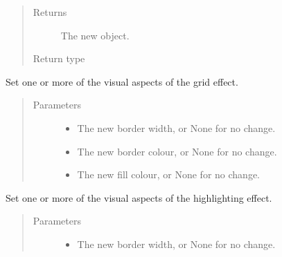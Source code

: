 \documentclass[letterpaper,10pt,english]{sphinxmanual}
\begin{document}
\begin{fulllineitems}
\begin{fulllineitems}
\begin{quote}
\begin{description}
\item[{Returns}] \leavevmode
The new  object.

\item[{Return type}] \leavevmode
{\hyperref[\detokenize{api:gui.core.GridGeometry}]{}}

\end{description}\end{quote}

\end{fulllineitems}


\begin{fulllineitems}
\label{\detokenize{api:gui.core.Grid.set_grid_visual}}
Set one or more of the visual aspects of the grid effect.
\begin{quote}\begin{description}
\item[{Parameters}] \leavevmode\begin{itemize}
\item {} 
 \textendash{} The new border width, or None for no change.

\item {} 
 \textendash{} The new border colour, or None for no change.

\item {} 
 \textendash{} The new fill colour, or None for no change.

\end{itemize}

\end{description}\end{quote}

\end{fulllineitems}


\begin{fulllineitems}
\label{\detokenize{api:gui.core.Grid.set_highlight_visual}}
Set one or more of the visual aspects of the highlighting effect.
\begin{quote}\begin{description}
\item[{Parameters}] \leavevmode\begin{itemize}
\item {} 
 \textendash{} The new border width, or None for no change.


\end{itemize}
\end{description}
\end{quote}
\end{fulllineitems}
\end{fulllineitems}
\end{document}
